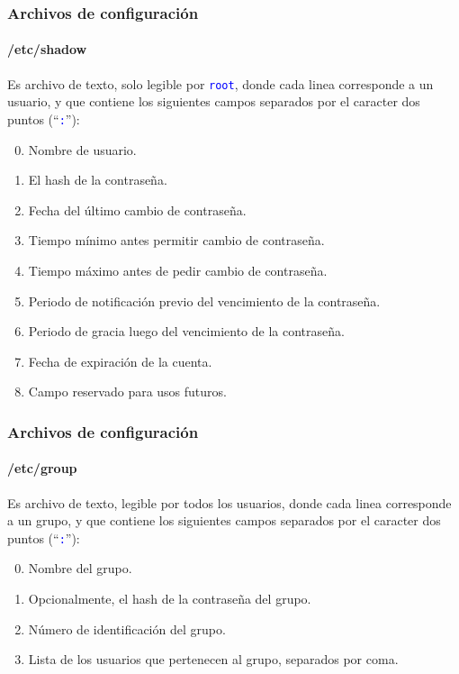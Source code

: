 \documentclass[11pt,a4paper,spanish]{beamer}
\newcommand{\codeword}[1]{\mbox{\texttt{\textcolor{blue}{#1}}}}
\begin{document}
\begin{frame}

    \frametitle{Archivos de configuración}
    \framesubtitle{/etc/shadow}

    Es archivo de texto, solo legible por \codeword{root}, donde cada linea
    corresponde a un usuario, y que contiene los siguientes campos separados
    por el caracter dos puntos (``\codeword{:}''):

    \begin{enumerate}
        \setcounter{enumi}{-1}
        \item Nombre de usuario.
        \item El hash de la contraseña.
        \item Fecha del último cambio de contraseña.
        \item Tiempo mínimo antes permitir cambio de contraseña.
        \item Tiempo máximo antes de pedir cambio de contraseña.
        \item Periodo de notificación previo del vencimiento de la contraseña.
        \item Periodo de gracia luego del vencimiento de la contraseña.
        \item Fecha de expiración de la cuenta.
        \item Campo reservado para usos futuros.
    \end{enumerate}

\end{frame}

\begin{frame}

    \frametitle{Archivos de configuración}
    \framesubtitle{/etc/group}

    Es archivo de texto, legible por todos los usuarios, donde cada linea
    corresponde a un grupo, y que contiene los siguientes campos separados por
    el caracter dos puntos (``\codeword{:}''):

    \begin{enumerate}
        \setcounter{enumi}{-1}
        \item Nombre del grupo.
        \item Opcionalmente, el hash de la contraseña del grupo.
        \item Número de identificación del grupo.
        \item Lista de los usuarios que pertenecen al grupo, separados por
            coma.
    \end{enumerate}

\end{frame}
\end{document}
